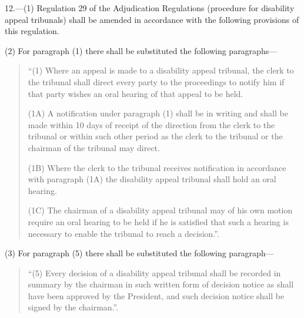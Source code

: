 \documentclass[a4paper]{article}
\begin{document}
12.—(1) Regulation 29 of the Adjudication Regulations (procedure for disability appeal tribunals) shall be amended in accordance with the following provisions of this regulation.

(2) For paragraph (1) there shall be substituted the following paragraphs—
\begin{quotation}
“(1) Where an appeal is made to a disability appeal tribunal, the clerk to the tribunal shall direct every party to the proceedings to notify him if that party wishes an oral hearing of that appeal to be held.

(1A) A notification under paragraph (1) shall be in writing and shall be made within 10 days of receipt of the direction from the clerk to the tribunal or within such other period as the clerk to the tribunal or the chairman of the tribunal may direct.

(1B) Where the clerk to the tribunal receives notification in accordance with paragraph (1A) the disability appeal tribunal shall hold an oral hearing.

(1C) The chairman of a disability appeal tribunal may of his own motion require an oral hearing to be held if he is satisfied that such a hearing is necessary to enable the tribunal to reach a decision.”.
\end{quotation}

(3) For paragraph (5) there shall be substituted the following paragraph—
\begin{quotation}
“(5) Every decision of a disability appeal tribunal shall be recorded in summary by the chairman in such written form of decision notice as shall have been approved by the President, and such decision notice shall be signed by the chairman.”.
\end{quotation}
\end{document}
